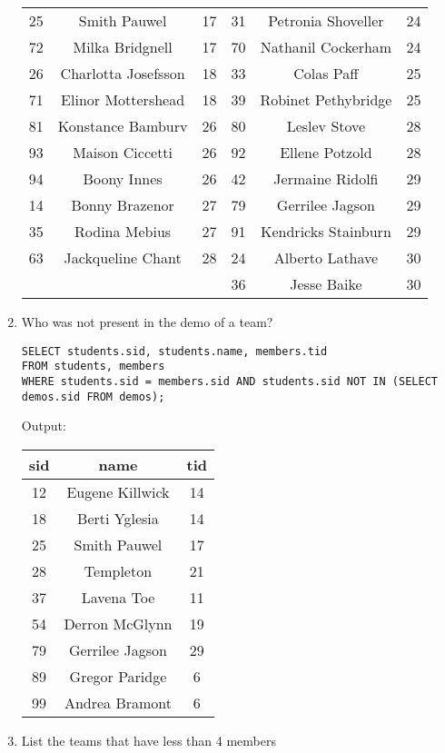 \documentclass[11pt,letterpaper]{article}
\begin{document}
\begin{enumerate}
\begin{center}
\begin{tabular}{ | c  c  c |  c c c | }
25 & Smith Pauwel & 17 & 31 & Petronia Shoveller & 24 \\
72 & Milka Bridgnell & 17 & 70 & Nathanil Cockerham & 24 \\
26 & Charlotta Josefsson & 18 & 33 & Colas Paff & 25 \\
71 & Elinor Mottershead & 18 & 39 & Robinet Pethybridge & 25 \\
\hline
\hline
81 & Konstance Bamburv & 26 & 80 & Leslev Stove & 28 \\
93 & Maison Ciccetti & 26 & 92 & Ellene Potzold & 28 \\
94 & Boony Innes & 26 & 42 & Jermaine Ridolfi & 29 \\
14 & Bonny Brazenor & 27 & 79 & Gerrilee Jagson & 29 \\
35 & Rodina Mebius & 27 & 91 & Kendricks Stainburn & 29 \\
63 & Jackqueline Chant & 28 & 24 & Alberto Lathave & 30 \\
 & & & 36 & Jesse Baike & 30 \\
\hline
\end{tabular}
\end{center}

\item Who was not present in the demo of a team?

\begin{verbatim}
SELECT students.sid, students.name, members.tid
FROM students, members
WHERE students.sid = members.sid AND students.sid NOT IN (SELECT demos.sid FROM demos);
\end{verbatim}
Output:
\begin{center}
\begin{tabular}{ | c  c  c | }
 \hline
 sid & name & tid \\
 \hline
 12 & Eugene Killwick & 14 \\
 18 & Berti Yglesia & 14 \\
 25 & Smith Pauwel & 17 \\
 28 & Templeton & 21 \\
 37 & Lavena Toe & 11 \\
 54 & Derron McGlynn & 19 \\
 79 & Gerrilee Jagson & 29 \\
 89 & Gregor Paridge & 6 \\
 99 & Andrea Bramont & 6 \\
 \hline
\end{tabular}
\end{center}

\item List the teams that have less than 4 members


\end{enumerate}
\end{document}

